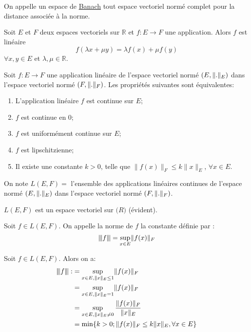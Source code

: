 \documentclass[12pt,a4paper]{article}
\begin{document}
\begin{flushleft}
\begin{mydef}
On appelle un espace de \underline{Banach} tout espace vectoriel normé complet pour la distance associée à la norme. 
\end{mydef}

\begin{rap}
Soit $E$ et $F$ deux espaces vectoriels sur $\mathbb{R}$ et $f: E \longrightarrow F$ une application. Alors $f$ est linéaire \ssi $$f( \lambda x + \mu y) = \lambda f(x) + \mu f(y)$$
$\forall x,y \in E$ et $\lambda , \mu \in \mathbb{R}$.
\end{rap}

\begin{thm}
Soit $f:E \longrightarrow F$ une application linéaire de l'espace vectoriel normé $(E, \lVert . \rVert_E)$ dans l'espace vectoriel normé $(F, \lVert . \rVert_F)$. Les propriétés suivantes sont équivalentes:
\begin{enumerate}
\item L'application linéaire $f$ est continue sur $E$;
\item $f$ est continue en 0;
\item $f$ est uniformément continue sur $E$;
\item $f$ est lipschitzienne;
\item Il existe une constante $k > 0$, telle que $\lVert f(x) \rVert_F \leq k \lVert x \rVert_E$, $\forall x \in E$.
\end{enumerate}
\end{thm}

On note $L(E,F)  =$ l'ensemble des applications linéaires continues de l'espace normé $(E, \lVert . \rVert_E)$ dans l'espace vectoriel normé $(F, \lVert . \rVert_F)$.

\begin{rem}
$L(E,F)$ est un espace vectoriel sur $\mathbb(R)$ (évident).
\end{rem}

\begin{mydef}
Soit $f \in L(E,F)$. On appelle la norme de $f$ la constante définie par : $${\left\vert\kern-0.25ex\left\vert\kern-0.25ex\left\vert f \right\vert\kern-0.25ex\right\vert\kern-0.25ex\right\vert} = \sup\limits_{x \in E} \lVert f(x) \rVert_F$$
\end{mydef}

\begin{thm}
Soit $f \in L(E,F)$. Alors on a: 
\begin{align*}
{\left\vert\kern-0.25ex\left\vert\kern-0.25ex\left\vert f \right\vert\kern-0.25ex\right\vert\kern-0.25ex\right\vert} : &= \sup\limits_{x \in E , \lVert x \rVert_E \leq 1} \lVert f(x) \rVert_F\\
	       &=\sup\limits_{x \in E , \lVert x \rVert_E = 1} \lVert f(x) \rVert_F\\
		&= \sup\limits_{x \in E , \lVert x \rVert_E \neq 0} \frac{\lVert f(x) \rVert_F}{\lVert x \rVert_E}\\
		&= \min \{ k > 0; \lVert f(x) \rVert_F \leq k \lVert x \rVert_E , \forall x \in E \}
\end{align*}
\end{thm}


\end{flushleft}
\end{document}
